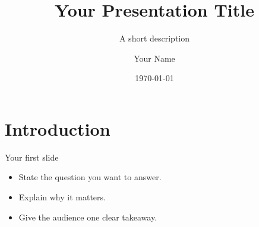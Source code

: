 \documentclass[11pt]{beamer}
\title{Your Presentation Title}
\subtitle{A short description}
\author{Your Name}
\institute{University of Minnesota}
\date{\today}
\begin{document}
\begin{frame}
  \titlepage
\end{frame}
\section{Introduction}
\begin{frame}{Your first slide}
  \begin{itemize}
    \item State the question you want to answer.
    \item Explain why it matters.
    \item Give the audience one clear takeaway.
  \end{itemize}
\end{frame}
\end{document}

